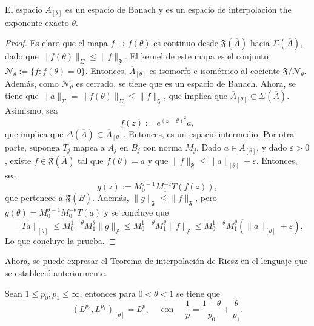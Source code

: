\begin{theorem}
	El espacio $\overline{A}_{[\theta]}$ es un espacio de Banach y es un espacio de interpolación the exponente exacto $\theta$.
\end{theorem}
\begin{proof}
	Es claro que el mapa $f\mapsto f(\theta)$ es continuo desde $\mathfrak{F}(\overline{A})$ hacia $\Sigma(\overline{A})$, dado que $\|f(\theta)\|_{\Sigma} \leq \|f\|_{\mathfrak{F}}$. El kernel de este mapa es el conjunto $\mathcal{N}_\theta:=\{f: f(\theta)=0\}$. Entonces, $\overline{A}_{[\theta]}$ es isomorfo e isométrico al cociente $\mathfrak{F}/\mathcal{N}_\theta$. Además, como $\mathcal{N}_\theta$ es cerrado, se tiene que es un espacio de Banach. Ahora, se tiene que $\|a\|_\Sigma = \|f(\theta)\|_\Sigma \leq \|f\|_{\mathfrak{F}}$, que implica que $\overline{A}_{[\theta]} \subset \Sigma(\overline{A})$. Asimismo, sea 
	\begin{equation*}
		f(z) := e^{(z-\theta)^2}a,
	\end{equation*}
	que implica que $\Delta(\overline{A})\subset \overline{A}_{[\theta]}$. Entonces, es un espacio intermedio. Por otra parte, suponga $T_j$ mapea a $A_j$ en $B_j$ con norma $M_j$. Dado $a\in\overline{A}_{[\theta]}$, y dado $\varepsilon>0$, existe $f\in\mathfrak{F}(\overline{A})$ tal que $f(\theta)=a$ y que $\|f\|_{\mathfrak{F}}\leq \|a\|_{[\theta]}+\varepsilon$. Entonces, sea 
	\begin{equation*}
		g(z) := M_0^{z-1}M_1^{-z}T(f(z)),
	\end{equation*}
	que pertenece a $\mathfrak{F}(\overline{B})$. Además, $\|g\|_{\mathfrak{F}} \leq \|f\|_{\mathfrak{F}}$, pero $g(\theta)=M_0^{\theta-1}M_0^{-\theta} T(a)$ y se concluye que 
	\begin{equation*}
		\|Ta\|_{[\theta]} \leq M_0^{1-\theta}M_1^\theta \|g\|_{\mathfrak{F}} \leq M_0^{1-\theta}M_1^\theta \|f\|_{\mathfrak{F}} \leq M_0^{1-\theta}M_1^\theta (\|a\|_{[\theta]} + \varepsilon) .
	\end{equation*}
	Lo que concluye la prueba.
\end{proof}
Ahora, se puede expresar el Teorema de interpolación de Riesz en el lenguaje que se estableció anteriormente. 
\begin{theorem}
	Sean $1\leq p_0,p_1\leq \infty$, entonces para $0<\theta<1$ se tiene que 
	\begin{equation*}
		(L^{p_0}, L^{p_1})_{[\theta]} = L^p, \quad \text{ con } \quad \frac{1}{p} = \frac{1-\theta}{p_0} + \frac{\theta}{p_1}.
	\end{equation*}
\end{theorem}
